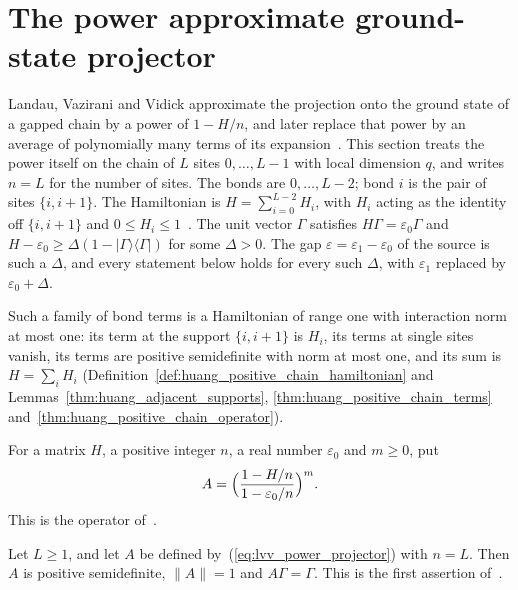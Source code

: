\section{The power approximate ground-state projector}
\label{sec:lvv_power_projector}

Landau, Vazirani and Vidick approximate the projection onto the ground state of
a gapped chain by a power of $1-H/n$, and later replace that power by an average
of polynomially many terms of its
expansion~\cite[lines 599--616]{Landau2015Polynomial}. This section treats the
power itself on the chain of $L$ sites $0,\ldots,L-1$ with local dimension $q$, and writes $n=L$
for the number of sites. The bonds are $0,\ldots,L-2$; bond $i$ is the pair of
sites $\{i,i+1\}$. The Hamiltonian is
$H=\sum_{i=0}^{L-2}H_i$, with $H_i$ acting as the identity off $\{i,i+1\}$ and
$0\le H_i\le1$~\cite[lines 283--284]{Landau2015Polynomial}. The unit vector
$\Gamma$ satisfies $H\Gamma=\varepsilon_0\Gamma$ and
$H-\varepsilon_0\ge\Delta(1-|\Gamma\rangle\langle\Gamma|)$ for some $\Delta>0$.
The gap $\varepsilon=\varepsilon_1-\varepsilon_0$ of the source is such a
$\Delta$, and every statement below holds for every such $\Delta$, with
$\varepsilon_1$ replaced by $\varepsilon_0+\Delta$.

Such a family of bond terms is a Hamiltonian of range one with interaction norm at
most one: its term at the support $\{i,i+1\}$ is $H_i$, its terms at single sites
vanish, its terms are positive semidefinite with norm at most one, and its sum is
$H=\sum_iH_i$
(Definition~\ref{def:huang_positive_chain_hamiltonian} and
Lemmas~\ref{thm:huang_adjacent_supports}, \ref{thm:huang_positive_chain_terms}
and~\ref{thm:huang_positive_chain_operator}).

\begin{definition}
    \label{def:lvv_power_projector}
    \leanok
    For a matrix $H$, a positive integer $n$, a real number $\varepsilon_0$ and
    $m\ge0$, put
    \begin{align}
        A=\Bigl(\frac{1-H/n}{1-\varepsilon_0/n}\Bigr)^{m}.
        \label{eq:lvv_power_projector}
    \end{align}
    This is the operator of~\cite[lines 599--600]{Landau2015Polynomial}.
\end{definition}

\begin{lemma}
    \label{thm:lvv_power_projector_basic}
    \leanok
    Let $L\ge1$, and let $A$ be defined by~(\ref{eq:lvv_power_projector}) with
    $n=L$. Then $A$ is positive semidefinite, $\|A\|=1$ and $A\Gamma=\Gamma$.
    This is the first assertion of~\cite[line 602]{Landau2015Polynomial}.
\end{lemma}

